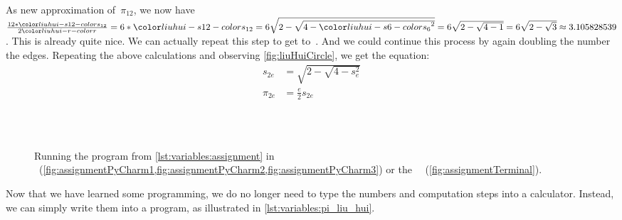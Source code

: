 As new approximation of~$\pi_{12}$, we now have $\frac{12*\liuhuist}{2\liuhuir}=6*\liuhuist=6\sqrt{2-\sqrt{4-\liuhuiss^2}}=6\sqrt{2-\sqrt{4-1}}=6\sqrt{2-\sqrt{3}}\approx 3.105828539$.
This is already quite nice.
We can actually repeat this step to get to~\liuhuistf.
And we could continue this process by again doubling the number the edges.
Repeating the above calculations and observing \cref{fig:liuHuiCircle}, we get the equation:%
%
\begin{align}%
s_{2e} &= \sqrt{2-\sqrt{4-s_e^2}}\label{eq:liuhui:sidelength}\\%
\pi_{2e} &= \frac{e}{2} s_{2e}\label{eq:liuhui:approx}%
\end{align}%
%
%
%
%
\begin{figure}[tb]%
\centering%
%
%
\hfill%
%
%
\\%
%
%
\\%
%
%
%
\caption{Running the program  from \cref{lst:variables:assignment} in \pycharm~(\cref{fig:assignmentPyCharm1,fig:assignmentPyCharm2,fig:assignmentPyCharm3}) or the \ubuntu\ ~(\cref{fig:assignmentTerminal}).}%
\label{fig:variables:liuHuiPi}%
\end{figure}%
%
Now that we have learned some programming, we do no longer need to type the numbers and computation steps into a calculator.
Instead, we can simply write them into a program, as illustrated in \cref{lst:variables:pi_liu_hui}.
